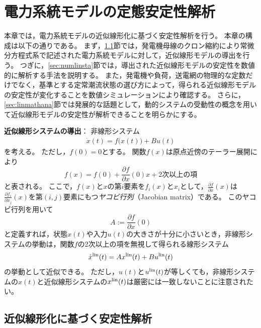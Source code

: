 \documentclass[tombow,dvipdfmx]{corona-a5-1.1}
\begin{document}
\chapter{電力系統モデルの定態安定性解析}\label{sec:staana}

本章では，電力系統モデルの近似線形化に基づく安定性解析を行う。
本章の構成は以下の通りである。
まず，\ref{sec:stalin}節では，発電機母線のクロン縮約により常微分方程式系で記述された電力系統モデルに対して，近似線形モデルの導出を行う。
つぎに，\ref{sec:numlinsta}節では，導出された近似線形モデルの安定性を数値的に解析する手法を説明する。
また，発電機や負荷，送電網の物理的な定数だけでなく，基準とする定常潮流状態の選び方によって，得られる近似線形モデルの安定性が変化することを数値シミュレーションにより確認する。
さらに，\ref{sec:linmathana}節では発展的な話題として，動的システムの受動性の概念を用いて近似線形モデルの安定性が解析できることを明らかにする。

\begin{COLUMN}
\noindent \textbf{近似線形システムの導出}：
非線形システム
\begin{align*}
\dot{x}(t) = f\bigl(x(t)\bigr) + Bu(t) 
\end{align*}
を考える。
ただし，$f(0)=0$とする。
関数$f(x)$は原点近傍のテーラー展開により
\[
f(x)=f(0) + \frac{\partial f}{\partial x} (0) x + \mbox{2次以上の項}
\]
と表される。
ここで，$f(x)$と$x$の第$i$要素を$f_i(x)$と$x_i$として，$\tfrac{\partial f}{\partial x}(x)$は$\tfrac{\partial f_i}{\partial x_j}(x)$を第$(i,j)$要素にもつ\emph{ヤコビ行列}（Jacobian matrix）である。
このヤコビ行列を用いて
\[
A:=\frac{\partial f}{\partial x} (0)
\]
と定義すれば，状態$x(t)$や入力$u(t)$の大きさが十分に小さいとき，非線形システムの挙動は，関数$f$の2次以上の項を無視して得られる線形システム
\begin{align*}
\dot{x}^{\rm lin}(t) = Ax^{\rm lin}(t) + Bu^{\rm lin}(t) 
\end{align*}
の挙動として近似できる。 
ただし，$u(t)$と$u^{\rm lin}(t)$が等しくても，非線形システムの$x(t)$と近似線形システムの$x^{\rm lin}(t)$は厳密には一致しないことに注意されたい。
\end{COLUMN}



\section{近似線形化に基づく安定性解析}\label{sec:stalin}
\end{document}
